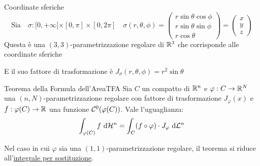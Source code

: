 \documentclass{article}
\begin{document}
\begin{example}{Coordinate sferiche}{}
    \[\text{Sia} \quad \sigma : [0,+\infty[\times [0, \pi]\times [0,2\pi] \quad \sigma(r, \theta, \phi) = \begin{pmatrix} r\sin\theta\cos\phi \\ r\sin\theta\sin\phi \\ r\cos\theta \end{pmatrix}= \begin{pmatrix} x \\ y \\ z    \end{pmatrix}\]    
    Questa è una $(3,3)$-parametrizzazione regolare di $\mathbb{R}^3$ che corrisponde alle coordinate sferiche
    \begin{center}
    \end{center}
    E il suo fattore di trasformazione è $J_\sigma(r,\theta,\phi) = r^2 \sin\theta$
\end{example}

\begin{theorem}{Teorema della Formula dell'Area}{TFA}
    Sia $C$ un compatto di $\mathbb{R}^n$ e $\varphi : C \to \mathbb{R}^N$ una $(n,N)$-parametrizzazione regolare con fattore di trasformazione $J_\varphi (x)$ e $f : \varphi(C)\to \mathbb{R}$ una funzione $\mathcal{C}^0(\varphi(C))$. Vale l'uguaglianza:
    \[\int_{\varphi(C)} f \text{ d} \mathcal{H}^n = \int_{C} (f\circ \varphi) \cdot J_\varphi \text{ d} \mathcal{L}^n\]
\end{theorem}

\begin{remark}{}{}
    Nel caso in cui $\varphi$ sia una $(1,1)$-parametrizzazione regolare, il teorema si riduce all'\href{prop:IFC}{integrale per sostituzione}.
\end{remark}
\end{document}
